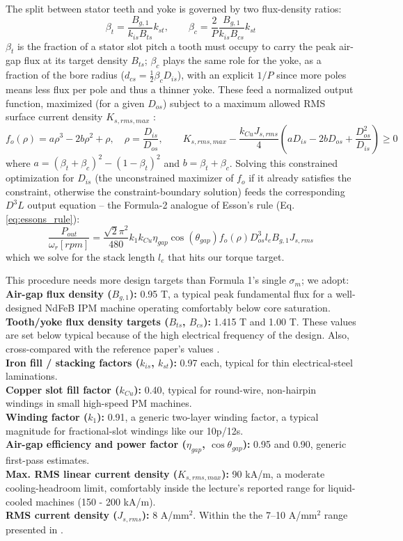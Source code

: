 \documentclass[11pt,a4paper]{article}
\begin{document}
The split between stator teeth and yoke is governed by two flux-density ratios:
$$\beta_t = \frac{B_{g,1}}{k_{is}B_{ts}}k_{st}, \qquad \beta_c = \frac{2}{P}\frac{B_{g,1}}{k_{is}B_{cs}}k_{st}$$
$\beta_t$ is the fraction of a stator slot pitch a tooth must occupy to carry the peak air-gap flux at its target density $B_{ts}$; $\beta_c$ plays the same role for the yoke, as a fraction of the bore radius ($d_{cs}=\tfrac{1}{2}\beta_c D_{is}$), with an explicit $1/P$ since more poles means less flux per pole and thus a thinner yoke. These feed a normalized output function, maximized (for a given $D_{os}$) subject to a maximum allowed RMS surface current density $K_{s,rms,max}$ \cite{LucaLecture6}:
$$f_o(\rho) = a\rho^3 - 2b\rho^2 + \rho, \quad \rho = \frac{D_{is}}{D_{os}}, \qquad K_{s,rms,max} - \frac{k_{Cu}J_{s,rms}}{4}\left(aD_{is}-2bD_{os}+\frac{D_{os}^2}{D_{is}}\right) \geq 0$$
where $a=(\beta_t+\beta_c)^2-(1-\beta_t)^2$ and $b=\beta_t+\beta_c$. Solving this constrained optimization for $D_{is}$ (the unconstrained maximizer of $f_o$ if it already satisfies the constraint, otherwise the constraint-boundary solution) feeds the corresponding $D^3L$ output equation -- the Formula-2 analogue of Esson's rule (Eq. \ref{eq:essons_rule}):
\begin{equation}
\label{eq:essons_rule_d3l}
\frac{P_{out}}{\omega_r[rpm]} = \frac{\sqrt{2}\pi^2}{480}k_1 k_{Cu}\eta_{gap}\cos(\theta_{gap})f_o(\rho)D_{os}^3 l_e B_{g,1}J_{s,rms}
\end{equation}
which we solve for the stack length $l_e$ that hits our torque target.

This procedure needs more design targets than Formula 1's single $\sigma_m$; we adopt:
\\\textbf{Air-gap flux density ($B_{g,1}$):} 0.95 T, a typical peak fundamental flux for a well-designed NdFeB IPM machine operating comfortably below core saturation.
\\\textbf{Tooth/yoke flux density targets ($B_{ts}$, $B_{cs}$):} 1.415 T and 1.00 T. These values are set below typical because of the high electrical frequency of the design. Also, cross-compared with the reference paper's values \cite{DiGerlandoRicca2022}.
\\\textbf{Iron fill / stacking factors ($k_{is}$, $k_{st}$):} 0.97 each, typical for thin electrical-steel laminations.
\\\textbf{Copper slot fill factor ($k_{Cu}$):} 0.40, typical for round-wire, non-hairpin windings in small high-speed PM machines.
\\\textbf{Winding factor ($k_1$):} 0.91, a generic two-layer winding factor, a typical magnitude for fractional-slot windings like our 10p/12s.
\\\textbf{Air-gap efficiency and power factor ($\eta_{gap}$, $\cos\theta_{gap}$):} 0.95 and 0.90, generic first-pass estimates.
\\\textbf{Max. RMS linear current density ($K_{s,rms,max}$):} 90 kA/m, a moderate cooling-headroom limit, comfortably inside the lecture's \cite{LucaLecture6} reported range for liquid-cooled machines (150 - 200 kA/m).
\\\textbf{RMS current density ($J_{s,rms}$):} 8 A/mm$^2$. Within the the 7--10 A/mm$^2$ range presented in \cite{LucaLecture6}.
\end{document}
